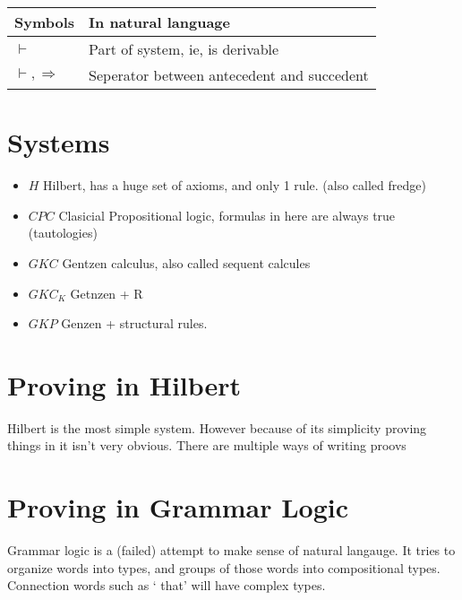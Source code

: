 \documentclass{article}
\begin{document}
\noindent
\begin{tabular}{@{}ll@{}}
Symbols&
In natural language \\ \toprule
$\vdash$ 					& Part of system, ie, is derivable \\
$\vdash, \Rightarrow$ 		& Seperator between antecedent and succedent\\ \bottomrule
\end{tabular}


\section{Systems}
\begin{itemize}
	\item $H$  Hilbert, has a huge set of axioms, and only 1 rule. (also called fredge)
	\item $CPC$ Clasicial Propositional logic, formulas in here are always true
(tautologies)
	\item $GKC$ Gentzen calculus, also called sequent calcules
	\item $GKC_K$  Getnzen + R 
	\item $GKP$ Genzen + structural rules.
\end{itemize}

\section{Proving in Hilbert}
Hilbert is the most simple system. However because of its simplicity proving
things in it isn't very obvious. There are multiple ways of writing proovs

\section{Proving in Grammar Logic}
Grammar logic is a (failed) attempt to make sense of natural langauge. It
tries to organize words into types, and groups of those words into compositional
types.
Connection words such as ` that' will have complex types.
\end{document}
